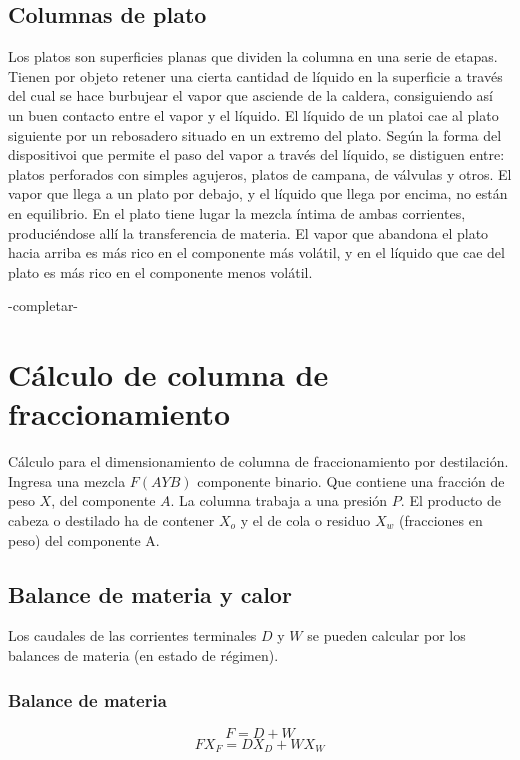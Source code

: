 \documentclass[11pt,openany]{book}
\begin{document}
\subsection{Columnas de plato}
Los platos son superficies planas que dividen la columna en una serie de etapas.
Tienen por objeto retener una cierta cantidad de líquido en la superficie a través del cual se hace 
burbujear el vapor que asciende de la caldera, consiguiendo así un buen contacto entre el vapor y el líquido.
El líquido de un platoi cae al plato siguiente por un rebosadero situado en un extremo del plato.
Según la forma del dispositivoi que permite el paso del vapor a través del líquido, se distiguen entre:
platos perforados con simples agujeros, platos de campana, de válvulas y otros.
El vapor que llega a un plato por debajo, y el líquido que llega por encima, no están en equilibrio. 
En el plato tiene lugar la mezcla íntima de ambas corrientes, produciéndose allí la transferencia de materia.
El vapor que abandona el plato hacia arriba es más rico en el componente más volátil, y en el líquido que 
cae del plato es más rico en el componente menos volátil. 

-completar-

\section{Cálculo de columna de fraccionamiento}
Cálculo para el dimensionamiento de columna de fraccionamiento por destilación.
Ingresa una mezcla $F(A Y B)$ componente binario. Que contiene una fracción de peso $X$,
del componente $A$.
La columna trabaja a una presión $P$.
El producto de cabeza o destilado ha de contener $X_o$ y el de cola o residuo $X_w$
(fracciones en peso) del componente A.

\subsection{Balance de materia y calor}
Los caudales de las corrientes terminales $D$ y $W$ se pueden calcular por los balances de materia 
(en estado de régimen).

\subsubsection{Balance de materia}
 
\begin{equation} \label{eq:total}
F=D+W   
\end{equation}
\begin{equation} \label{eq:componentes} 
F X_F = D X_D + W X_W 
\end{equation}
\end{document}
